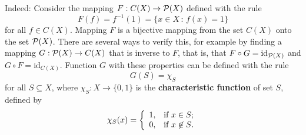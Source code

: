 \documentclass[11pt,paper=b5,footinclude,headinclude]{scrbook} %
\def\sledi {{~\Rightarrow~}}
\def\brez {{\,\setminus\,}}
\theoremstyle{remark}
\theoremstyle{definition} %
\theoremstyle{theorem} %
\begin{document}
Indeed:
Consider the mapping
$F:C(X)\to {\cal P}(X)$ defined with the rule
$$F(f) = f^{-1}(1) = \{x\in X\,:\,f(x) = 1\}$$
for all $f\in C(X)$.
Mapping $F$ is a bijective mapping from the set $C(X)$ onto the set ${\cal P}(X)$.
There are several ways to verify this, for example by finding a mapping
$G:{\cal P}(X)\to C(X)$ that is inverse to $F$, that is, that
$F\circ G = \textrm{id}_{{\cal P}(X)}$
and
$G\circ F = \textrm{id}_{C(X)}$.
Function $G$ with these properties can be defined with the rule
$$G(S) = \chi_S$$
for all $S\subseteq X$, where
${\chi_S}:X\to \{0,1\}$ is the \textbf{ characteristic function} of set $S$, defined by
$$\chi_S(x) = \left\{
  \begin{array}{ll}
              1, & \hbox{if  $x\in S$;} \\
              0, & \hbox{if $x\not\in S$.}
            \end{array}
          \right.$$
%
%
%
%
%
%
%
%
\end{document}
